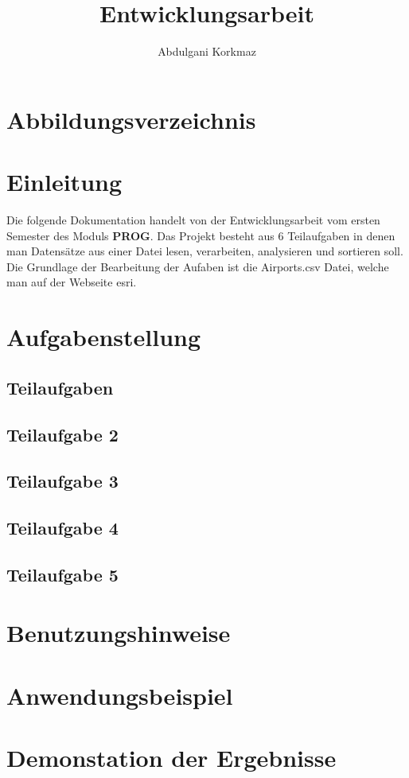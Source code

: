 \documentclass[]{article}
\author{Abdulgani Korkmaz}
\title{Entwicklungsarbeit}
\begin{document}
\maketitle
\newpage
\section{Abbildungsverzeichnis}
\section{Einleitung}
Die folgende Dokumentation handelt von der Entwicklungsarbeit vom ersten Semester des Moduls \textbf{PROG}.
Das Projekt besteht aus 6 Teilaufgaben in denen man Datensätze aus einer Datei lesen, verarbeiten, analysieren
und sortieren soll. Die Grundlage der Bearbeitung der Aufaben ist die Airports.csv Datei, welche man auf der Webseite
esri.
\section{Aufgabenstellung}
\subsection{Teilaufgaben}
    \subsection{Teilaufgabe 2}
    \subsection{Teilaufgabe 3}
    \subsection{Teilaufgabe 4}
    \subsection{Teilaufgabe 5}
\section{Benutzungshinweise}
\section{Anwendungsbeispiel}
\section{Demonstation der Ergebnisse}
\end{document}
